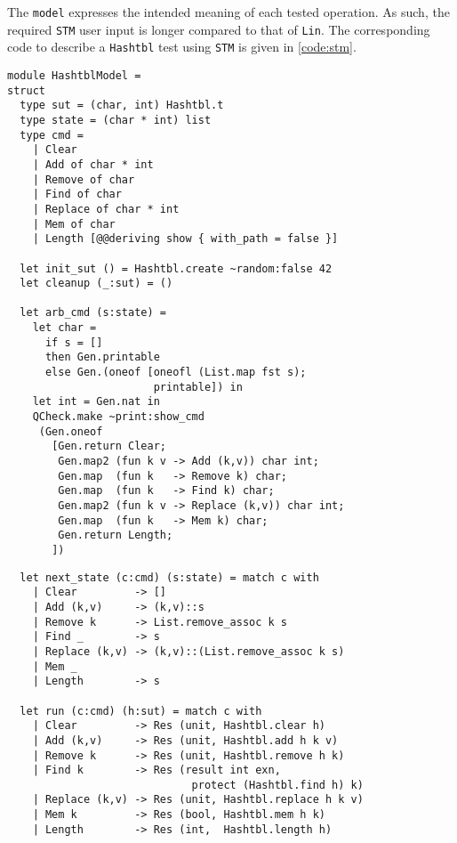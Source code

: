 \documentclass[twocolumn,10pt]{article}
\begin{document}
The \texttt{model} expresses the intended meaning of each tested
operation. As such, the required \texttt{STM} user input is longer compared
to that of \texttt{Lin}. The corresponding code to describe a \texttt{Hashtbl}
test using \texttt{STM} is given in \cref{code:stm}.

\begin{figure*}[t]
  \hspace*{-5mm}
  \hfil
  \small
  \begin{minipage}[t]{.46\textwidth}
\begin{lstlisting}
module HashtblModel =
struct
  type sut = (char, int) Hashtbl.t
  type state = (char * int) list
  type cmd =
    | Clear
    | Add of char * int
    | Remove of char
    | Find of char
    | Replace of char * int
    | Mem of char
    | Length [@@deriving show { with_path = false }]

  let init_sut () = Hashtbl.create ~random:false 42
  let cleanup (_:sut) = ()

  let arb_cmd (s:state) =
    let char =
      if s = []
      then Gen.printable
      else Gen.(oneof [oneofl (List.map fst s);
                       printable]) in
    let int = Gen.nat in
    QCheck.make ~print:show_cmd
     (Gen.oneof
       [Gen.return Clear;
        Gen.map2 (fun k v -> Add (k,v)) char int;
        Gen.map  (fun k   -> Remove k) char;
        Gen.map  (fun k   -> Find k) char;
        Gen.map2 (fun k v -> Replace (k,v)) char int;
        Gen.map  (fun k   -> Mem k) char;
        Gen.return Length;
       ])
\end{lstlisting}
  \end{minipage}
  \hfil
  \begin{minipage}[t]{.49\textwidth}
\begin{lstlisting}
  let next_state (c:cmd) (s:state) = match c with
    | Clear         -> []
    | Add (k,v)     -> (k,v)::s
    | Remove k      -> List.remove_assoc k s
    | Find _        -> s
    | Replace (k,v) -> (k,v)::(List.remove_assoc k s)
    | Mem _
    | Length        -> s

  let run (c:cmd) (h:sut) = match c with
    | Clear         -> Res (unit, Hashtbl.clear h)
    | Add (k,v)     -> Res (unit, Hashtbl.add h k v)
    | Remove k      -> Res (unit, Hashtbl.remove h k)
    | Find k        -> Res (result int exn,
                             protect (Hashtbl.find h) k)
    | Replace (k,v) -> Res (unit, Hashtbl.replace h k v)
    | Mem k         -> Res (bool, Hashtbl.mem h k)
    | Length        -> Res (int,  Hashtbl.length h)


\end{lstlisting}
\end{minipage}
\end{figure*}
\end{document}
